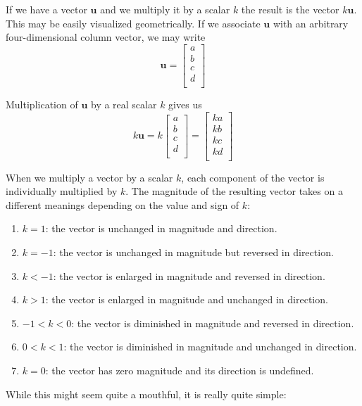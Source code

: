 \documentclass[
  a4paper,
]{article}
\begin{document}
If we have a vector \(\mathbf{u}\) and we multiply it by a scalar \(k\)
the result is the vector \(k\mathbf{u}\). This may be easily visualized
geometrically. If we associate \(\mathbf{u}\) with an arbitrary
four-dimensional column vector, we may write \[
\mathbf{u} = \begin{bmatrix}a\\b\\c\\d\\\end{bmatrix}
\]

Multiplication of \(\mathbf{u}\) by a real scalar \(k\) gives us \[
k\mathbf{u} = k\begin{bmatrix}a\\b\\c\\d\\\end{bmatrix} = \begin{bmatrix}ka\\kb\\kc\\kd\\\end{bmatrix}
\]

When we multiply a vector by a scalar \(k\), each component of the
vector is individually multiplied by \(k\). The magnitude of the
resulting vector takes on a different meanings depending on the value
and sign of \(k\):

\begin{enumerate}
\item
  \(k = 1\): the vector is unchanged in magnitude and direction.
\item
  \(k = -1\): the vector is unchanged in magnitude but reversed in
  direction.
\item
  \(k < -1\): the vector is enlarged in magnitude and reversed in
  direction.
\item
  \(k > 1\): the vector is enlarged in magnitude and unchanged in
  direction.
\item
  \(-1 < k < 0\): the vector is diminished in magnitude and reversed in
  direction.
\item
  \(0 < k < 1\): the vector is diminished in magnitude and unchanged in
  direction.
\item
  \(k = 0\): the vector has zero magnitude and its direction is
  undefined.
\end{enumerate}

While this might seem quite a mouthful, it is really quite simple:
\end{document}
